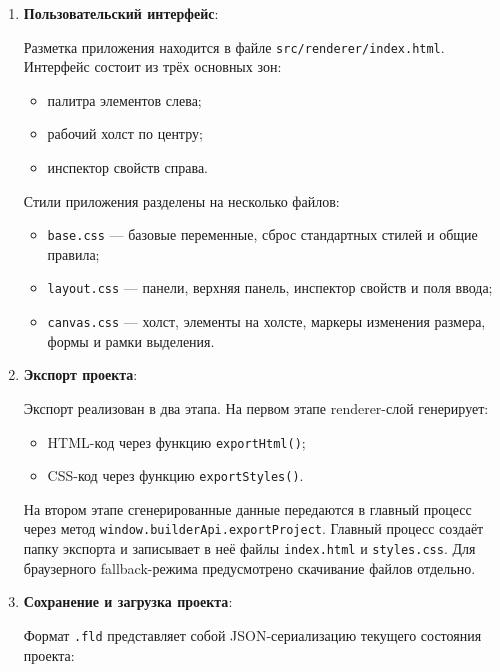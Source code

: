 \documentclass[14pt,a4paper]{extarticle}
\begin{document}
{{\begin{enumerate}
    Вложенность элементов реализована через поле \texttt{parentId}. Если элемент находится внутри контейнера, то его \texttt{parentId} равен идентификатору этого контейнера.

    \item \textbf{Пользовательский интерфейс}:

    Разметка приложения находится в файле \texttt{src/renderer/index.html}. Интерфейс состоит из трёх основных зон:
    \begin{itemize}
        \item палитра элементов слева;
        \item рабочий холст по центру;
        \item инспектор свойств справа.
    \end{itemize}

    Стили приложения разделены на несколько файлов:
    \begin{itemize}
        \item \texttt{base.css} --- базовые переменные, сброс стандартных стилей и общие правила;
        \item \texttt{layout.css} --- панели, верхняя панель, инспектор свойств и поля ввода;
        \item \texttt{canvas.css} --- холст, элементы на холсте, маркеры изменения размера, формы и рамки выделения.
    \end{itemize}

    \item \textbf{Экспорт проекта}:

    Экспорт реализован в два этапа. На первом этапе renderer-слой генерирует:
    \begin{itemize}
        \item HTML-код через функцию \texttt{exportHtml()};
        \item CSS-код через функцию \texttt{exportStyles()}.
    \end{itemize}

    На втором этапе сгенерированные данные передаются в главный процесс через метод \texttt{window.builderApi.exportProject}. Главный процесс создаёт папку экспорта и записывает в неё файлы \texttt{index.html} и \texttt{styles.css}. Для браузерного fallback-режима предусмотрено скачивание файлов отдельно.

    \item \textbf{Сохранение и загрузка проекта}:

    Формат \texttt{.fld} представляет собой JSON-сериализацию текущего состояния проекта:


\end{enumerate}}}
\end{document}
